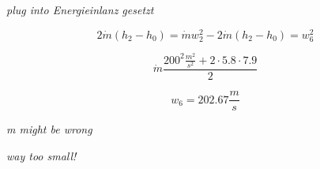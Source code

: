 \textit{plug into Energieinlanz gesetzt}

\begin{equation*}
2\dot{m}(h_2 - h_0) = \dot{m}w_2^2 - 2\dot{m}(h_2 - h_0) = w_6^2
\end{equation*}

\begin{equation*}
\dot{m} \frac{200^2 \frac{m^2}{s^2} + 2 \cdot 5.8 \cdot 7.9}{2}
\end{equation*}

\begin{equation*}
w_6 = 202.67 \frac{m}{s}
\end{equation*}

\textit{m might be wrong}

\textit{way too small!}